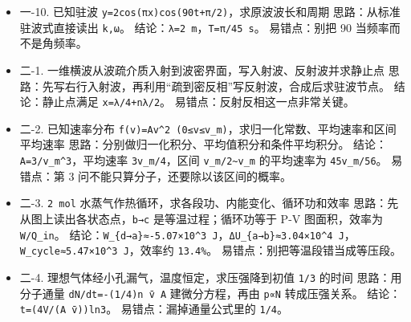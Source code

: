 \documentclass[12pt,a4paper]{ctexart}
\begin{document}
\begin{itemize}

\item 一-10. 已知驻波 \texttt{y=2cos(πx)cos(90t+π/2)}，求原波波长和周期 思路：从标准驻波式直接读出 \texttt{k,ω}。 结论：\texttt{λ=2 m}，\texttt{T=π/45 s}。 易错点：别把 90 当频率而不是角频率。

\end{itemize}

\begin{itemize}

\item 二-1. 一维横波从波疏介质入射到波密界面，写入射波、反射波并求静止点 思路：先写右行入射波，再利用“疏到密反相”写反射波，合成后求驻波节点。 结论：静止点满足 \texttt{x=λ/4+nλ/2}。 易错点：反射反相这一点非常关键。

\end{itemize}

\begin{itemize}

\item 二-2. 已知速率分布 \texttt{f(v)=Av\textasciicircum{}2 (0≤v≤v\_m)}，求归一化常数、平均速率和区间平均速率 思路：分别做归一化积分、平均值积分和条件平均积分。 结论：\texttt{A=3/v\_m\textasciicircum{}3}，平均速率 \texttt{3v\_m/4}，区间 \texttt{v\_m/2\textasciitilde{}v\_m} 的平均速率为 \texttt{45v\_m/56}。 易错点：第 3 问不能只算分子，还要除以该区间的概率。

\end{itemize}

\begin{itemize}

\item 二-3. \texttt{2 mol} 水蒸气作热循环，求各段功、内能变化、循环功和效率 思路：先从图上读出各状态点，\texttt{b→c} 是等温过程；循环功等于 P-V 图面积，效率为 \texttt{W/Q\_in}。 结论：\texttt{W\_\{d→a\}≈-5.07×10\textasciicircum{}3 J}，\texttt{ΔU\_\{a→b\}≈3.04×10\textasciicircum{}4 J}，\texttt{W\_cycle≈5.47×10\textasciicircum{}3 J}，效率约 \texttt{13.4\%}。 易错点：别把等温段错当成等压段。

\end{itemize}

\begin{itemize}

\item 二-4. 理想气体经小孔漏气，温度恒定，求压强降到初值 \texttt{1/3} 的时间 思路：用分子通量 \texttt{dN/dt=-(1/4)n v̄ A} 建微分方程，再由 \texttt{p∝N} 转成压强关系。 结论：\texttt{t=(4V/(A v̄))ln3}。 易错点：漏掉通量公式里的 \texttt{1/4}。

\end{itemize}
\end{document}
